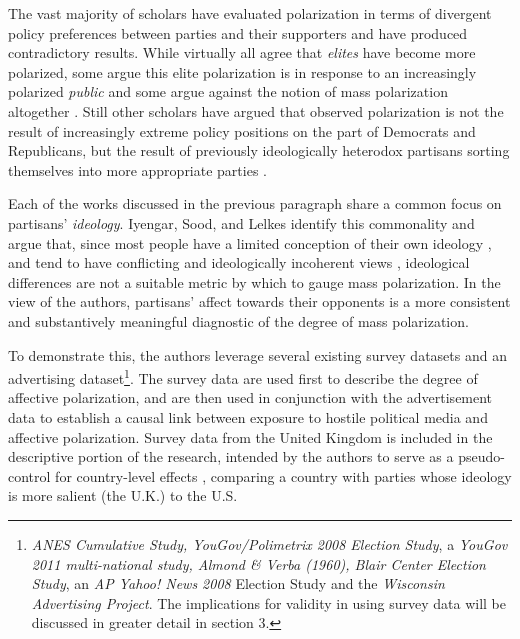 \documentclass[12pt]{article}
\begin{document}
The vast majority of scholars have evaluated polarization in terms of divergent policy preferences between parties and their supporters and have produced contradictory results. While virtually all agree that \textit{elites} have become more polarized, some argue this elite polarization is in response to an increasingly polarized \textit{public} \citep{abramowitz2010disappearing} and some argue against the notion of mass polarization altogether \citep{fiorina2012disconnect, fiorina2005culture}. Still other scholars have argued that observed polarization is not the result of increasingly extreme policy positions on the part of Democrats and Republicans, but the result of previously ideologically heterodox partisans sorting themselves into more appropriate parties \citep{levendusky2009partisan}.

Each of the works discussed in the previous paragraph share a common focus on partisans' \textit{ideology}. Iyengar, Sood, and Lelkes identify this commonality and argue that, since most people have a limited conception of their own ideology \citep{converse1964nature}, and tend to have conflicting \citep{mcclosky1984american} and ideologically incoherent views \citep[p. 76--96]{zaller1992nature}, ideological differences are not a suitable metric by which to gauge mass polarization. In the view of the authors, partisans' affect towards their opponents is a more consistent and substantively meaningful diagnostic of the degree of mass polarization.

To demonstrate this, the authors leverage several existing survey datasets and an advertising dataset\footnote{\textit{ANES Cumulative Study, YouGov/Polimetrix 2008 Election Study}, a \textit{YouGov 2011 multi-national study, Almond \& Verba (1960), Blair Center Election Study}, an \textit{AP Yahoo! News 2008} Election Study and the \textit{Wisconsin Advertising Project}. The implications for validity in using survey data will be discussed in greater detail in section 3.}. The survey data are used first to describe the degree of affective polarization, and are then used in conjunction with the advertisement data to establish a causal link between exposure to hostile political media and affective polarization. Survey data from the United Kingdom is included in the descriptive portion of the research, intended by the authors to serve as a pseudo-control for country-level effects \citep[p. 407]{iyengar2012affect}, comparing a country with parties whose ideology is more salient (the U.K.) to the U.S.
\end{document}
